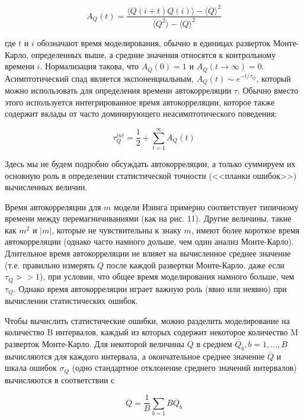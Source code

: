 \documentclass[11pt]{article}
\begin{document}
\begin{equation}
A_Q(t)=\frac{\langle Q(i+t)Q(i)\rangle - \langle Q\rangle ^2}{\langle Q^2\rangle- \langle Q\rangle^2}
\label{eq_46}
\end{equation}

где $t$ и $i$ обозначают время моделирования, обычно в единицах разверток Монте-Карло, определенных выше, а средние значения относятся к контрольному времени $i$. Нормализация такова, что $A_Q(0) = 1$ и $A_Q(t → ∞) = 0$. Асимптотический спад является экспоненциальным, $A_Q(t) \sim e^{−t/\tau_Q}$, который можно использовать для определения времени автокорреляции $\tau$. Обычно вместо этого используется интегрированное время автокорреляции, которое также содержит вклады от часто доминирующего неасимптотического поведения;

\begin{equation}
\tau_Q^{int}=\frac{1}{2}+\sum\limits_{t=1}^{∞}A_Q(t)
\label{eq_47}
\end{equation}

Здесь мы не будем подробно обсуждать автокорреляции, а только суммируем их основную роль в определении статистической точности (<<планки ошибок>>) вычисленных величин.

Время автокорреляции для $m$ модели Изинга примерно соответствует типичному времени между перемагничиваниями (как на рис. 11). Другие величины, такие как $m^2$ и $| m |$, которые не чувствительны к знаку $m$, имеют более короткое время автокорреляции (однако часто намного дольше, чем один анализ Монте-Карло). Длительное время автокорреляции не влияет на вычисленное среднее значение (т.е. правильно измерять $Q$ после каждой развертки Монте-Карло, даже если $\tau_Q >> 1$), при условии, что общее время моделирования намного больше, чем $\tau_Q$.
Однако время автокорреляции играет важную роль (явно или неявно) при вычислении статистических ошибок.

Чтобы вычислить статистические ошибки, можно разделить моделирование на количество B интервалов, каждый из которых содержит некоторое количество M разверток Монте-Карло. Для некоторой величины $Q$ в среднем $\overline{Q}_b, b = 1,\dots, B$ вычисляются для каждого интервала, а окончательное среднее значение $\overline{Q}$ и шкала ошибок $\sigma_Q$ (одно стандартное отклонение среднего значений интервалов) вычисляются в соответствии с

\begin{equation}
\overline{Q} = \frac{1}{B}\sum\limits_{b=1}{B}\overline{Q}_b
\label{eq_48}
\end{equation}
\end{document}
